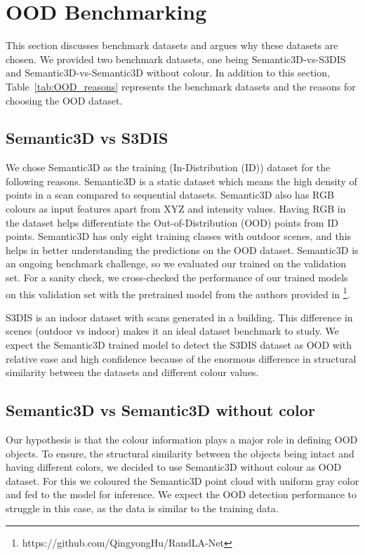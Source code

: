 \section{OOD Benchmarking}
This section discusses benchmark datasets and argues why these datasets are chosen.
We provided two benchmark datasets, one being Semantic3D-vs-S3DIS and Semantic3D-vs-Semantic3D without colour.
In addition to this section, Table~\ref{tab:OOD_reasons} represents the benchmark datasets and the reasons for choosing the OOD dataset.

\subsection{Semantic3D vs S3DIS}
We chose Semantic3D as the training (In-Distribution (ID)) dataset for the following reasons.
Semantic3D is a static dataset which means the high density of points in a scan compared to sequential datasets.
Semantic3D also has RGB colours as input features apart from XYZ and intensity values.
Having RGB in the dataset helps differentiate the Out-of-Distribution (OOD) points from ID points.
Semantic3D has only eight training classes with outdoor scenes, and this helps in better understanding the predictions on the OOD dataset.
Semantic3D is an ongoing benchmark challenge, so we evaluated our trained on the validation set.
For a sanity check, we cross-checked the performance of our trained models on this validation set with the pretrained model from the authors provided in \footnote[1]{https://github.com/QingyongHu/RandLA-Net}.

S3DIS is an indoor dataset with scans generated in a building.
This difference in scenes (outdoor vs indoor) makes it an ideal dataset benchmark to study.
We expect the Semantic3D trained model to detect the S3DIS dataset as OOD with relative ease and high confidence because of the enormous difference in structural similarity between the datasets and different colour values.

\subsection{Semantic3D vs Semantic3D without color}
Our hypothesis is that the colour information plays a major role in defining OOD objects.
To ensure, the structural similarity between the objects being intact and having different colors, we decided to use Semantic3D without colour as OOD dataset.
For this we coloured the Semantic3D point cloud with uniform gray color and fed to the model for inference.
We expect the OOD detection performance to struggle in this case, as the data is similar to the training data.

